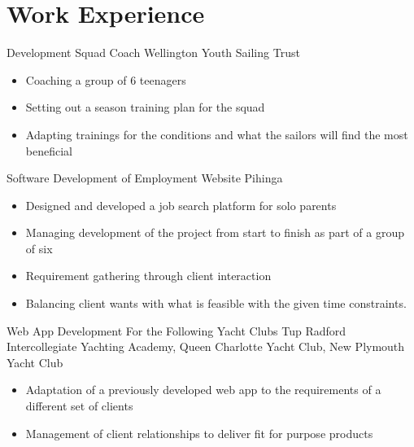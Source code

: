 \documentclass[a4paper]{twentysecondcv} %
\begin{document}

\section{Work Experience}

\begin{workexperience} %
    {Development Squad Coach}
    {Wellington Youth Sailing Trust}
    {
        \begin{itemize}
            \item Coaching a group of 6 teenagers
            \item Setting out a season training plan for the squad
            \item Adapting trainings for the conditions and what the sailors will find the most beneficial 
        \end{itemize}
    }

    {Software Development of Employment Website}
    {Pihinga}
    {
        \begin{itemize}
            \item Designed and developed a job search platform for solo parents
            \item Managing development of the project from start to finish as part of a group of six
            \item Requirement gathering through client interaction
            \item Balancing client wants with what is feasible with the given time constraints.
        \end{itemize}
    }

    {Web App Development For the Following Yacht Clubs}
    {Tup Radford Intercollegiate Yachting Academy, Queen Charlotte Yacht Club, New Plymouth Yacht Club}
    {
        \begin{itemize}
            \item Adaptation of a previously developed web app to the requirements of a different set of clients
            \item Management of client relationships to deliver fit for purpose products
        \end{itemize}
    }


\end{workexperience}
\end{document}
